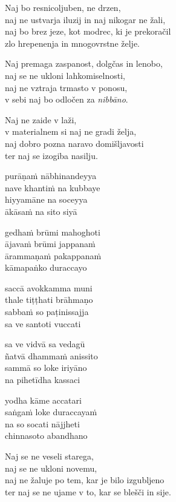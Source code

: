 Naj bo resnicoljuben, ne drzen,\\
naj ne ustvarja iluzij in naj nikogar ne žali,\\
naj bo brez jeze, kot modrec, ki je prekoračil\\
zlo hrepenenja in mnogovrstne želje.

Naj premaga zaspanost, dolgčas in lenobo,\\
naj se ne ukloni lahkomiselnosti,\\
naj ne vztraja trmasto v ponosu,\\
v sebi naj bo odločen za \emph{nibbāno}.

Naj ne zaide v laži,\\
v materialnem si naj ne gradi želja,\\
naj dobro pozna naravo domišljavosti\\
ter naj se izogiba nasilju.


\clearpage

purāṇaṁ nābhinandeyya\\
nave khantiṁ na kubbaye\\
hiyyamāne na soceyya\\
ākāsaṁ na sito siyā

gedhaṁ brūmi mahoghoti\\
ājavaṁ brūmi jappanaṁ\\
ārammaṇaṁ pakappanaṁ\\
kāmapaṅko duraccayo

saccā avokkamma muni\\
thale tiṭṭhati brāhmaṇo\\
sabbaṁ so paṭinissajja\\
sa ve santoti vuccati

sa ve vidvā sa vedagū\\
ñatvā dhammaṁ anissito\\
sammā so loke iriyāno\\
na pihetīdha kassaci

yodha kāme accatari\\
saṅgaṁ loke duraccayaṁ\\
na so socati nājjheti\\
chinnasoto abandhano


\clearpage

Naj se ne veseli starega,\\
naj se ne ukloni novemu,\\
naj ne žaluje po tem, kar je bilo izgubljeno\\
ter naj se ne ujame v to, kar se blešči in sije.

